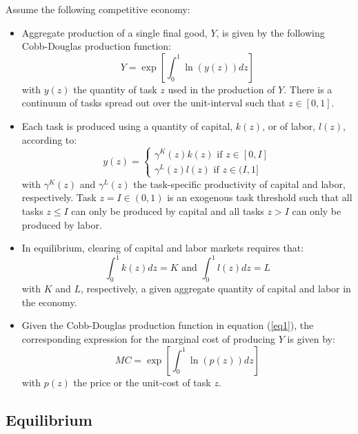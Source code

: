 \documentclass[a4paper,12pt]{article}
\begin{document}
Assume the following competitive economy:

\begin{itemize}
\item Aggregate production of a single final good, $Y$, is given by the following Cobb-Douglas production function:
\[
Y= \exp \left[ \int_{0}^{1} \ln (y(z))dz \right] \tag{2.1}  \label{eq1}
\]
with $y(z)$ the quantity of task $z$ used in the production of $Y$. There is a continuum of tasks spread out over the unit-interval such that $z \in [0,1]$.
\item Each task is produced using a quantity of capital, $k(z)$, or of labor, $l(z)$, according to:
\[
y(z) = 
\begin{cases}
\gamma^{K}(z)k(z) \text{ if } z \in [0,I] \tag{2.2} \\
\gamma^{L}(z)l(z) \text{ if } z \in (I,1] 
\end{cases} \label{eq2}
\]
with $\gamma^{K}(z)$ and $\gamma^{L}(z)$ the task-specific productivity of capital and labor, respectively. Task $z = I \in (0,1)$ is an exogenous task threshold such that all tasks $z \leq I$ can only be produced by capital and all tasks $z > I$ can only be produced by labor.
\item In equilibrium, clearing of capital and labor markets requires that:
\[
\int_{0}^{1} k(z)dz = K \text{ and } \int_{0}^{1} l(z)dz = L  \tag{2.3} \label{eq3}
\] 
with $K$ and $L$, respectively, a given aggregate quantity of capital and labor in the economy.
\item Given the Cobb-Douglas production function in equation (\ref{eq1}), the corresponding expression for the marginal cost of producing $Y$ is given by:
\[
MC = \exp \left[ \int_{0}^{1} \ln(p(z))dz \right] \tag{2.4} \label{eq4}
\]
with $p(z)$ the price or the unit-cost of task $z$.
\end{itemize}

\subsection{Equilibrium}
\end{document}
